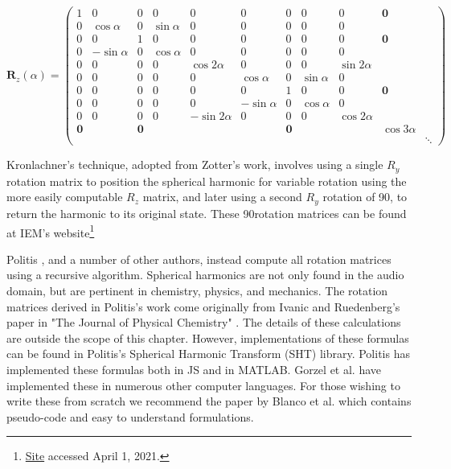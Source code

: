 \begin{equation}
\boldsymbol{R}_z(\alpha)=\left(\begin{array}{c|ccc|ccccc|cc}
1 & 0 & 0 & 0 & 0 & 0 & 0 & 0 & 0 & \mathbf{0} & \\
\hline 0 & \cos \alpha & 0 & \sin \alpha & 0 & 0 & 0 & 0 & 0 & \\
0 & 0 & 1 & 0 & 0 & 0 & 0 & 0 & 0 & \mathbf{0} & \\
0 & -\sin \alpha & 0 & \cos \alpha & 0 & 0 & 0 & 0 & 0 & & \\
\hline 0 & 0 & 0 & 0 & \cos 2 \alpha & 0 & 0 & 0 & \sin 2 \alpha & & \\
0 & 0 & 0 & 0 & 0 & \cos \alpha & 0 & \sin \alpha & 0 & \\
0 & 0 & 0 & 0 & 0 & 0 & 1 & 0 & 0 & \mathbf{0} & \\
0 & 0 & 0 & 0 & 0 & -\sin \alpha & 0 & \cos \alpha & 0 & & \\
0 & 0 & 0 & 0 & -\sin 2 \alpha & 0 & 0 & 0 & \cos 2 \alpha & & \\
\hline \mathbf{0} & & \mathbf{0} & & & & \mathbf{0} & & & \cos 3 \alpha & \\
 & & & & & & & & & & \ddots
\end{array}\right)
\end{equation}

Kronlachner's technique, adopted from Zotter's work, involves using a single $R_{y}$ rotation matrix to position the spherical harmonic for variable rotation using the more easily computable $R_{z}$ matrix, and later using a second $R_{y}$ rotation of 90\textdegree, to return the harmonic to its original state. These 90\textdegree rotation matrices can be found at IEM's website\footnote{\href{https://ambisonics.iem.at/xchange/fileformat/docs/spherical-harmonics-rotation}{Site} accessed April 1, 2021.}


Politis \cite{politis2016jsambisonics}, and a number of other authors, instead compute all rotation matrices using a recursive algorithm. Spherical harmonics are not only found in the audio domain, but are pertinent in chemistry, physics, and mechanics. The rotation matrices derived in Politis's work come originally from Ivanic and Ruedenberg's paper in "The Journal of Physical Chemistry" \cite{ivanic1996rotation}. 
The details of these calculations are outside the scope of this chapter. However, implementations of these formulas can be found in Politis's Spherical Harmonic Transform (SHT) library. Politis has implemented these formulas both in JS and in MATLAB. Gorzel et al. \cite{gorzel2019efficient} have implemented these in numerous other computer languages. For those wishing to write these from scratch we recommend the paper by Blanco et al. \cite{blanco1997evaluation} which contains pseudo-code and easy to understand formulations. 

